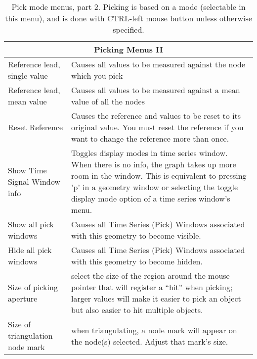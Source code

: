\begin{table}[ht]
  \begin{center}
    \begin{tabular}{|l|p{4 in}|} \hline
      \multicolumn{2}{|c|}{\textbf{Picking Menus II}} \\ \hline
    Reference lead, single value & Causes all values to be measured
    against the node which you pick \\
    Reference lead, mean value & Causes all values to be measured
    against a mean value of all the nodes \\
    Reset Reference & Causes the reference and values to be reset to
    its original value.  You must reset the reference if you want to
    change the reference more than once. \\
    Show Time Signal Window info & Toggles display modes in time series window.
    When there is no info, the graph takes up more room in the window. 
    This is equivalent to pressing 'p' in a geometry window or selecting
    the toggle display mode option of a time series window's menu. \\
    Show all pick windows & Causes all Time Series (Pick) Windows
    associated with this geometry to become visible. \\
    Hide all pick windows & Causes all Time Series (Pick) Windows
    associated with this geometry to become hidden. \\ 
    Size of picking aperture & select the size of the region around the
    mouse 
    pointer that will register a ``hit'' when picking; larger values will
    make it easier to pick an object but also easier to hit multiple
    objects. \\ 
    Size of triangulation node mark & when triangulating, a node
    mark will appear on the node(s) selected.  Adjust that mark's size. \\ \hline
    \end{tabular} 
  \end{center}
  \caption{\label{table:pickingtwo} Pick mode menus, part 2.  Picking is
    based on a 
    mode (selectable in this menu), and is done with CTRL-left mouse button
    unless otherwise specified.}
\end{table}

